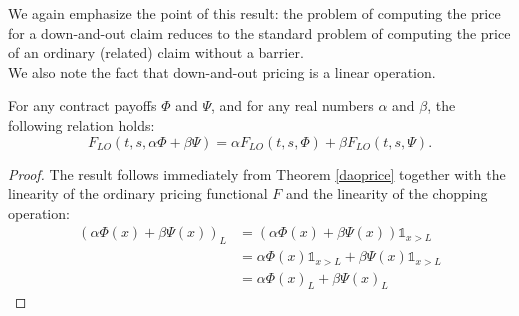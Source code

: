 We again emphasize the point of this result: the problem of computing the price for a down-and-out claim reduces to the standard problem of computing the price of an ordinary (related) claim without a barrier.\\
We also note the fact that down-and-out pricing is a linear operation.
\begin{corollary}\label{linearitycor}
    For any contract payoffs $\Phi$ and $\Psi$, and for any real numbers $\alpha$ and $\beta$, the following relation holds:
    \begin{equation}
        F_{LO}(t,s,\alpha\Phi+\beta\Psi) = \alpha F_{LO}(t,s,\Phi) + \beta F_{LO}(t,s,\Psi).
    \end{equation}
\end{corollary}
\begin{proof}
    The result follows immediately from Theorem \ref{daoprice} together with the linearity of the ordinary pricing functional $F$ and the linearity of the chopping operation:
    \begin{align*}
        (\alpha\Phi(x)+\beta\Psi(x))_L &= (\alpha\Phi(x)+\beta\Psi(x))\mathds{1}_{x>L} \\
        &=
        \alpha\Phi(x)\mathds{1}_{x>L} + \beta\Psi(x)\mathds{1}_{x>L} \\
        &=
        \alpha\Phi(x)_L + \beta\Psi(x)_L
    \end{align*}
\end{proof}

